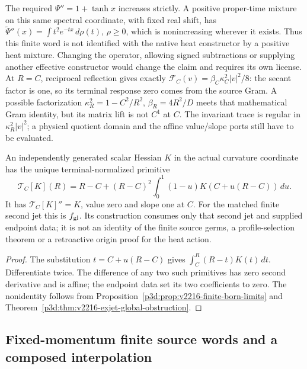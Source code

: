 \documentclass[12pt,a4paper]{article}
\begin{document}
\begin{remark}
The required $\Psi''=1+\tanh x$ increases strictly. A positive proper-time
mixture on this same spectral coordinate, with fixed real shift, has
$\widetilde\Psi''(x)=\int t^2e^{-tx}\,d\rho(t)$, $\rho\ge0$,
which is nonincreasing wherever it exists. Thus this finite word is not
identified with the native heat constructor by a positive heat mixture.
Changing the operator, allowing signed subtractions or supplying another
effective constructor would change the claim and requires its own license.
At $R=C$, reciprocal reflection gives exactly
$\mathcal F_C(v)=\beta_C\kappa_C^2|v|^2/8$: the secant factor is one,
so its terminal response zero comes from the source Gram. A possible
factorization $\kappa_R^2=1-C^2/R^2$, $\beta_R=4R^2/D$ meets that
mathematical Gram identity, but its matrix lift is not $C^1$ at $C$.
The invariant trace is regular in $\kappa_R^2|v|^2$; a physical quotient
domain and the affine value/slope ports still have to be evaluated.
\end{remark}

\begin{corollary}
\label{p3d:cor:v2216-second-jet-transgression}
An independently generated scalar Hessian $K$ in the actual curvature
coordinate has the unique terminal-normalized primitive
\[
 \mathcal T_C[K](R)=R-C+(R-C)^2
       \int_0^1(1-u)K(C+u(R-C))\,du.
\]
It has $\mathcal T_C[K]''=K$, value zero and slope one at $C$.
For the matched finite second jet this is $f_{\rm gl}$. Its construction
consumes only that second jet and supplied endpoint data; it is not an
identity of the finite source germs, a profile-selection theorem or a
retroactive origin proof for the heat action.
\end{corollary}
\begin{proof}
The substitution $t=C+u(R-C)$ gives
$\int_C^R(R-t)K(t)\,dt$. Differentiate twice. The difference of any two
such primitives has zero second derivative and is affine; the endpoint
data set its two coefficients to zero. The nonidentity follows from
Proposition~\ref{p3d:prop:v2216-finite-born-limits} and
Theorem~\ref{p3d:thm:v2216-exjet-global-obstruction}.
\end{proof}


\subsection{Fixed-momentum finite source words and a composed interpolation}
\label{p3d:sec:v2218-fixed-momentum-source}
\end{document}
